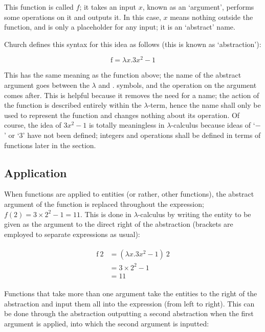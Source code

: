 \documentclass[Master.tex]{subfiles}
\begin{document}
This function is called $f$; it takes an input $x$, known as an `argument', performs some operations on it and outputs it. In this case, $x$ means nothing outside the function, and is only a placeholder for any input; it is an `abstract' name.

Church defines this syntax for this idea as follows (this is known as `abstraction'):

\begin{equation*}
    \bm{\mathrm{f}} = \lambda x.3x^2-1
\end{equation*}

This has the same meaning as the function above; the name of the abstract argument goes between the $\lambda$ and $.$ symbols, and the operation on the argument comes after. This is helpful because it removes the need for a name; the action of the function is described entirely within the $\lambda$-term, hence the name shall only be used to represent the function and changes nothing about its operation. Of course, the idea of $3x^2-1$ is totally meaningless in $\lambda$-calculus because ideas of `$-$' or `$3$' have not been defined; integers and operations shall be defined in terms of functions later in the section.

\subsection{Application}

When functions are applied to entities (or rather, other functions), the abstract argument of the function is replaced throughout the expression; $f(2) = 3 \times 2^2 - 1 = 11$. This is done in $\lambda$-calculus by writing the entity to be given as the argument to the direct right of the abstraction (brackets are employed to separate expressions as usual):

\begin{gather*}
\begin{aligned}
\bm{\mathrm{f}}\ 2 &= (\lambda x.3x^2-1)\ 2\\
&= 3 \times 2^2 - 1\\
&= 11
\end{aligned}
\end{gather*}

Functions that take more than one argument take the entities to the right of the abstraction and input them all into the expression (from left to right). This can be done through the abstraction outputting a second abstraction when the first argument is applied, into which the second argument is inputted:
\end{document}
